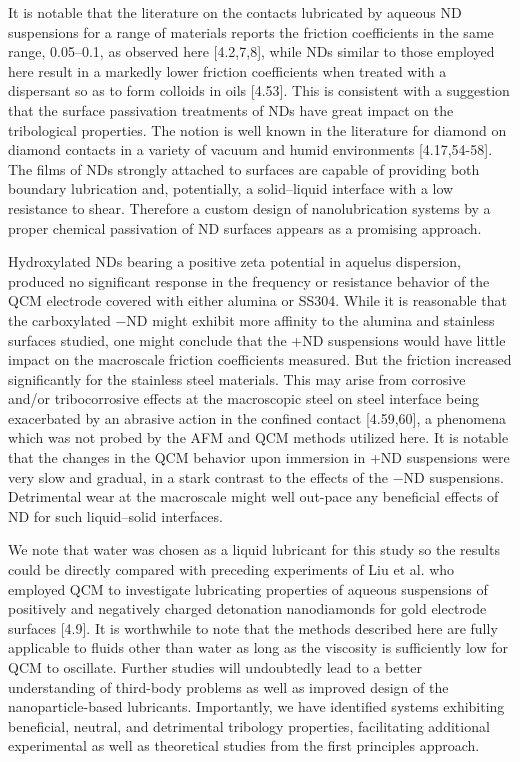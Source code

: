 It is notable that the literature on the contacts lubricated by aqueous ND suspensions for a range of materials reports the friction coefficients in the same range, 0.05–0.1, as observed here [4.2,7,8], while NDs similar to those employed here result in a markedly lower friction coefficients when treated with a dispersant so as to form colloids in oils [4.53]. This is consistent with a suggestion that the surface passivation treatments of NDs have great impact on the tribological properties. The notion is well known in the literature for diamond on diamond contacts in a variety of vacuum and humid environments [4.17,54-58]. The films of NDs strongly attached to surfaces are capable of providing both boundary lubrication and, potentially, a solid–liquid interface with a low resistance to shear. Therefore a custom design of nanolubrication systems by a proper chemical passivation of ND surfaces appears as a promising approach.

Hydroxylated NDs bearing a positive zeta potential in aquelus dispersion, produced no significant response in the frequency or resistance behavior of the QCM electrode covered with either alumina or SS304. While it is reasonable that the carboxylated −ND might exhibit more affinity to the alumina and stainless surfaces studied, one might conclude that the +ND suspensions would have little impact on the macroscale friction coefficients measured. But the friction increased significantly for the stainless steel materials. This may arise from corrosive and/or tribocorrosive effects at the macroscopic steel on steel interface being exacerbated by an abrasive action in the confined contact [4.59,60], a phenomena which was not probed by the AFM and QCM methods utilized here. It is notable that the changes in the QCM behavior upon immersion in +ND suspensions were very slow and gradual, in a stark contrast to the effects of the −ND suspensions. Detrimental wear at the macroscale might well out-pace any beneficial effects of ND for such liquid–solid interfaces.

We note that water was chosen as a liquid lubricant for this study so the results could be directly compared with preceding experiments of Liu et al. who employed QCM to investigate lubricating properties of aqueous suspensions of positively and negatively charged detonation nanodiamonds for gold electrode surfaces [4.9]. It is worthwhile to note that the methods described here are fully applicable to fluids other than water as long as the viscosity is sufficiently low for QCM to oscillate. Further studies will undoubtedly lead to a better understanding of third-body problems as well as improved design of the nanoparticle-based lubricants. Importantly, we have identified systems exhibiting beneficial, neutral, and detrimental tribology properties, facilitating additional experimental as well as theoretical studies from the first principles approach.

